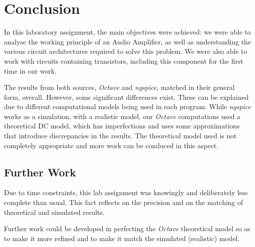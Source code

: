 \section{Conclusion}
\label{sec:conclusion}

\indent

In this laboratory assignment, the main objectives were achieved: we were able to analyse the working principle of an Audio Amplifier, as well as understanding the various circuit architectures required to solve this problem. We were also able to work with circuits containing transistors, including this component for the first time in our work. 

The results from both sources, \textit{Octave} and \textit{ngspice}, matched in their general form, overall. However, some significant differences exist. These can be explained due to different computational models being used in each program. While \textit{ngspice} works as a simulation, with a realistic model, our \textit{Octave} computations used a theoretical DC model, which has imperfections and uses some approximations that  introduce discrepancies in the results. The theoretical model used is not completely appropriate and more work can be conduced in this aspect.


\subsection{Further Work}
\indent 

Due to time constraints, this lab assignment was knowingly and deliberately less complete than usual. This fact reflects on the precision and on the matching of theoretical and simulated results. 

Further work could be developed in perfecting the {\it Octave} theoretical model so as to make it more refined and to make it match the simulated (realistic) model.

